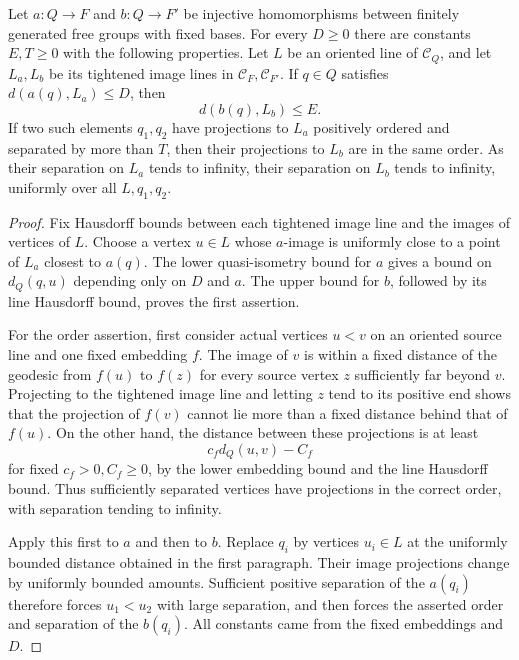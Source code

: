 \begin{lemma}
\label{exp:transport}
Let $a:Q\to F$ and $b:Q\to F'$ be injective homomorphisms between
finitely generated free groups with fixed bases. For every $D\ge0$
there are constants $E,T\ge0$ with the following properties.
Let $L$ be an oriented line of $\mathcal C_Q$, and let $L_a,L_b$
be its tightened image lines in $\mathcal C_F,\mathcal C_{F'}$.
If $q\in Q$ satisfies $d(a(q),L_a)\le D$, then
\[
 d(b(q),L_b)\le E.
\]
If two such elements $q_1,q_2$ have projections to $L_a$ positively
ordered and separated by more than $T$, then their projections to
$L_b$ are in the same order. As their separation on $L_a$ tends to
infinity, their separation on $L_b$ tends to infinity, uniformly over
all $L,q_1,q_2$.
\end{lemma}

\begin{proof}
Fix Hausdorff bounds between each tightened image line and the images
of vertices of $L$. Choose a vertex $u\in L$ whose $a$-image is
uniformly close to a point of $L_a$ closest to $a(q)$. The lower
quasi-isometry bound for $a$ gives a bound on $d_Q(q,u)$ depending
only on $D$ and $a$. The upper bound for $b$, followed by its
line Hausdorff bound, proves the first assertion.

For the order assertion, first consider actual vertices $u<v$ on an
oriented source line and one fixed embedding $f$. The image of $v$ is
within a fixed distance of the geodesic from $f(u)$ to $f(z)$ for every
source vertex $z$ sufficiently far beyond $v$. Projecting to the
tightened image line and letting $z$ tend to its positive end shows
that the projection of $f(v)$ cannot lie more than a fixed distance
behind that of $f(u)$. On the other hand, the distance between these
projections is at least
\[
 c_f d_Q(u,v)-C_f
\]
for fixed $c_f>0,C_f\ge0$, by the lower embedding bound and the
line Hausdorff bound. Thus sufficiently separated vertices have
projections in the correct order, with separation tending to infinity.

Apply this first to $a$ and then to $b$. Replace $q_i$ by vertices
$u_i\in L$ at the uniformly bounded distance obtained in the first
paragraph. Their image projections change by uniformly bounded
amounts. Sufficient positive separation of the $a(q_i)$ therefore
forces $u_1<u_2$ with large separation, and then forces the asserted
order and separation of the $b(q_i)$. All constants came from the
fixed embeddings and $D$.
\end{proof}

